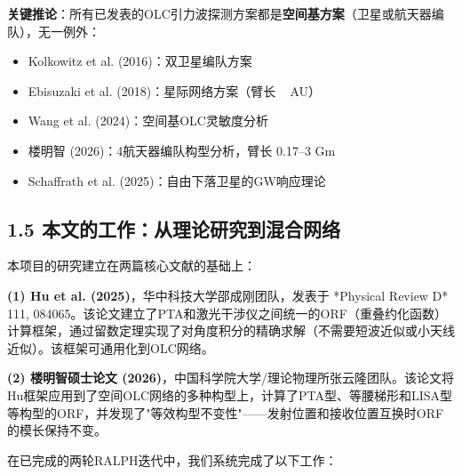 \documentclass[12pt,a4paper]{article}
\begin{document}
\textbf{关键推论}：所有已发表的OLC引力波探测方案都是\textbf{空间基方案}（卫星或航天器编队），无一例外：
\begin{itemize}
  \item Kolkowitz et al. (2016)：双卫星编队方案
  \item Ebisuzaki et al. (2018)：星际网络方案（臂长 ~ AU）
  \item Wang et al. (2024)：空间基OLC灵敏度分析
  \item 楼明智 (2026)：4航天器编队构型分析，臂长 0.17–3 Gm
  \item Schaffrath et al. (2025)：自由下落卫星的GW响应理论
\end{itemize}
\subsection{1.5 本文的工作：从理论研究到混合网络}


本项目的研究建立在两篇核心文献的基础上：

\textbf{(1) Hu et al. (2025)}，华中科技大学邵成刚团队，发表于 *Physical Review D* 111, 084065\cite{ref9}。该论文建立了PTA和激光干涉仪之间统一的ORF（重叠约化函数）计算框架，通过留数定理实现了对角度积分的精确求解（不需要短波近似或小天线近似）。该框架可通用化到OLC网络。

\textbf{(2) 楼明智硕士论文 (2026)}，中国科学院大学/理论物理所张云隆团队\cite{ref10}。该论文将Hu框架应用到了空间OLC网络的多种构型上，计算了PTA型、等腰梯形和LISA型等构型的ORF，并发现了"等效构型不变性"——发射位置和接收位置互换时ORF的模长保持不变。

在已完成的两轮RALPH迭代中，我们系统完成了以下工作：
\end{document}
